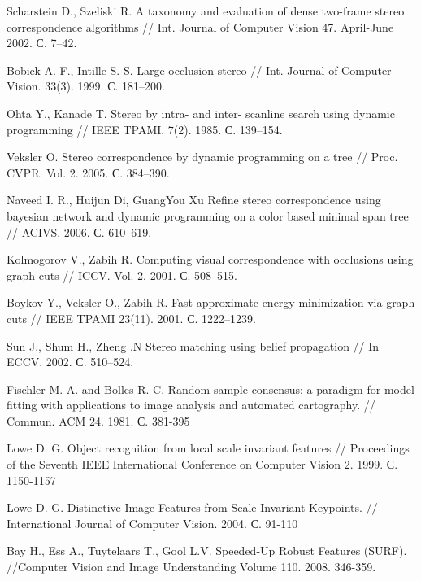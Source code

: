 
\begin{thebibliography}{1}
	Scharstein D., Szeliski R. A taxonomy and evaluation of dense
	two-frame stereo correspondence algorithms // Int. Journal of
	Computer Vision 47. April-June 2002. С. 7–42.
	
	Bobick A. F., Intille S. S. Large occlusion stereo // Int. Journal
	of Computer Vision. 33(3). 1999. С. 181–200.
	
	Ohta Y., Kanade T. Stereo by intra- and inter- scanline search
	using dynamic programming // IEEE TPAMI. 7(2). 1985.
	С. 139–154.
	
	Veksler O. Stereo correspondence by dynamic programming on a
	tree // Proc. CVPR. Vol. 2. 2005. С. 384–390.
	
	Naveed I. R., Huijun Di, GuangYou Xu Refine stereo
	correspondence using bayesian network and dynamic programming
	on a color based minimal span tree // ACIVS. 2006. С. 610–619.
	
	Kolmogorov V., Zabih R. Computing visual correspondence with
	occlusions using graph cuts // ICCV. Vol. 2. 2001. С. 508–515.
	
	Boykov Y., Veksler O., Zabih R. Fast approximate energy
	minimization via graph cuts // IEEE TPAMI 23(11). 2001.
	С. 1222–1239.
	
	Sun J., Shum H., Zheng .N Stereo matching using belief
	propagation // In ECCV. 2002. С. 510–524.
	
	
	Fischler M. A. and Bolles R. C. Random sample consensus: a paradigm for model fitting with applications to image analysis and automated cartography. // Commun. ACM 24. 1981. С. 381-395
	
	Lowe D. G. Object recognition from local scale invariant features // Proceedings of the Seventh IEEE International Conference on Computer Vision 2. 1999. С. 1150-1157
	
	Lowe D. G. Distinctive Image Features from Scale-Invariant Keypoints. // International Journal of Computer Vision. 2004. С. 91-110
	
	Bay H., Ess A., Tuytelaars T., Gool L.V. Speeded-Up Robust Features (SURF). //Computer Vision and Image Understanding Volume 110. 2008. 346-359.
	

\end{thebibliography}

